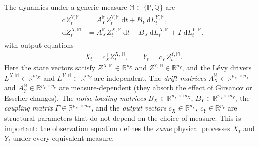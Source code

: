 \documentclass[10pt,reqno]{amsart}
\newcommand{\R}{\mathbb{R}}
\newcommand{\Q}{\mathbb{Q}}
\newcommand{\PP}{\mathbb{P}}
\newcommand{\1}{\mathbbm{1}}
\newcommand{\dd}{\mathrm{d}}
\begin{document}
The dynamics under a generic measure $\mathbb{M} \in \{\PP,\Q\}$ are
\begin{align}\label{eq:coupled_model}
\begin{aligned}
  \dd Z_t^{Y,\mathbb{M}}
    &= A_Y^{\mathbb{M}} Z_t^{Y,\mathbb{M}}\,\dd t
       + B_Y\,\dd L_t^{Y,\mathbb{M}},\\
  \dd Z_t^{X,\mathbb{M}}
    &= A_X^{\mathbb{M}} Z_t^{X,\mathbb{M}}\,\dd t
       + B_X\,\dd L_t^{X,\mathbb{M}}
       + \Gamma\,\dd L_t^{Y,\mathbb{M}},
\end{aligned}
\end{align}
with output equations
\begin{align}\label{eq:outputs_coupled}
  X_t = c_X^\top Z_t^{X,\mathbb{M}},
  \qquad
  Y_t = c_Y^\top Z_t^{Y,\mathbb{M}}.
\end{align}
Here the state vectors satisfy $Z^{X,\mathbb{M}} \in \R^{p_X}$ and
$Z^{Y,\mathbb{M}} \in \R^{p_Y}$, and the Lévy drivers $L^{X,\mathbb{M}} \in
\R^{m_X}$ and $L^{Y,\mathbb{M}} \in \R^{m_Y}$ are independent.
The \emph{drift matrices} $A_X^{\mathbb{M}} \in \R^{p_X \times p_X}$ and
$A_Y^{\mathbb{M}} \in \R^{p_Y \times p_Y}$ are measure-dependent (they absorb
the effect of Girsanov or Esscher changes). The \emph{noise-loading matrices}
$B_X \in \R^{p_X \times m_X}$, $B_Y \in \R^{p_Y \times m_Y}$, the
\emph{coupling matrix} $\Gamma \in \R^{p_X \times m_Y}$, and the
\emph{output vectors} $c_X \in \R^{p_X}$, $c_Y \in \R^{p_Y}$ are
structural parameters that do not depend on the choice of measure. This is
important: the observation equation defines the \emph{same} physical
processes $X_t$ and $Y_t$ under every equivalent measure.
\end{document}
